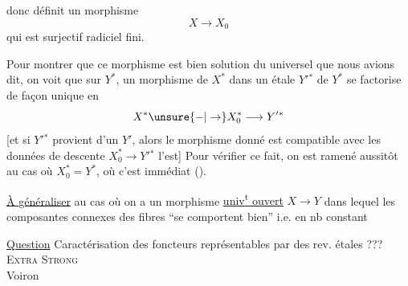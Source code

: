 donc définit un morphisme 
\[
X\longrightarrow X_0
\]
qui est surjectif radiciel fini.

Pour montrer que ce morphisme est bien solution du  universel que nous avions dit, on voit que sur $Y^{*}$, un morphisme de $X^{*}$ dans un  étale $Y'{}^{*}$ de $Y^{*}$ se factorise de façon unique en
\[
X^{*}\unsure{-|\to} X_0^{*}\longrightarrow Y'{}^{*}
\]
[et si $Y'{}^{*}$ provient d'un $Y'$, alors le morphisme donné est compatible avec les données de descente  $X^{*}_0\to Y'{}^{*}$ l'est] Pour vérifier ce fait, on est ramené aussitôt au cas où $X^{*}_0=Y^{*}$, où c'est immédiat \unsure{---} ().

\uline{À } \uline{généraliser} au cas où on a un morphisme  \uline{univ\textsuperscript{t} ouvert} $X\to Y$ dans lequel les composantes connexes  des fibres ``se comportent bien'' i.e. en nb  constant 

\uline{Question} Caractérisation des foncteurs représentables par des rev. étales ???
\textsc{Extra Strong}\\
 Voiron
